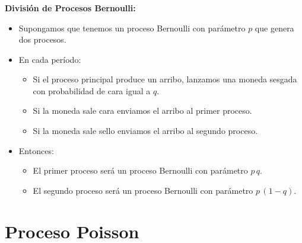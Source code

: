 \documentclass[ 10pt, xcolor = dvipsnames]{beamer}
\begin{document}
\begin{frame}[allowframebreaks]
\frametitle{\insertsection}

\textbf{Divisi\'on de Procesos Bernoulli:}
\begin{itemize}
\item Supongamos que tenemos un proceso Bernoulli con par\'ametro $p$ que genera dos procesos. 
\item En cada per\'iodo: 
\begin{itemize}
\item Si el proceso principal produce un arribo, lanzamos una moneda sesgada con probabilidad de cara igual a $q$. 
\item Si la moneda sale cara enviamos el arribo al primer proceso. 
\item Si la moneda sale sello enviamos el arribo al segundo proceso. 
\end{itemize}
\item Entonces: 
\begin{itemize}
\item El primer proceso ser\'a un proceso Bernoulli con par\'ametro $p \, q$. 
\item El segundo proceso ser\'a un proceso Bernoulli con par\'ametro $p \, (1-q)$. 
\end{itemize}
\end{itemize}

\end{frame}

\section{Proceso Poisson}
\end{document}
